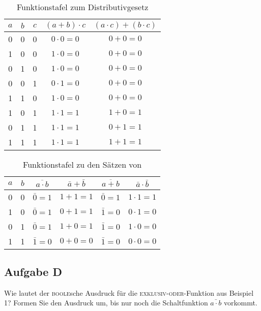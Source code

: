 \begin{table}
    \centering
    \begin{tabular}{ccc|c|c}
        $a$ & $b$ & $c$ & $(a + b) \cdot c$ & $(a \cdot c) + (b \cdot c)$
        \\
        \hline
        0 & 0 & 0 & $0 \cdot 0 = 0$ & $0 + 0 = 0$\\
        1 & 0 & 0 & $1 \cdot 0 = 0$ & $0 + 0 = 0$\\
        0 & 1 & 0 & $1 \cdot 0 = 0$ & $0 + 0 = 0$\\
        0 & 0 & 1 & $0 \cdot 1 = 0$ & $0 + 0 = 0$\\
        1 & 1 & 0 & $1 \cdot 0 = 0$ & $0 + 0 = 0$\\
        1 & 0 & 1 & $1 \cdot 1 = 1$ & $1 + 0 = 1$\\
        0 & 1 & 1 & $1 \cdot 1 = 1$ & $0 + 1 = 1$\\
        1 & 1 & 1 & $1 \cdot 1 = 1$ & $1 + 1 = 1$
    \end{tabular}
    \caption{%
        Funktionstafel zum Distributivgesetz
    }
    \label{tab:Aufgabe_C_dist}
\end{table}

\begin{table}
    \centering
    \begin{tabular}{cc|cc|cc}
        $a$ & $b$ & $\overline{a \cdot b}$ & $\bar a + \bar b$ & $\overline{a +
        b}$ & $\bar a \cdot \bar b$\\
        \hline
        0 & 0 & $\bar 0 = 1$ & $1 + 1 = 1$ & $\bar 0 = 1$ & $1 \cdot 1 = 1$\\
        1 & 0 & $\bar 0 = 1$ & $0 + 1 = 1$ & $\bar 1 = 0$ & $0 \cdot 1 = 0$\\
        0 & 1 & $\bar 0 = 1$ & $1 + 0 = 1$ & $\bar 1 = 0$ & $1 \cdot 0 = 0$\\
        1 & 1 & $\bar 1 = 0$ & $0 + 0 = 0$ & $\bar 1 = 0$ & $0 \cdot 0 = 0$
    \end{tabular}
    \caption{%
        Funktionstafel zu den Sätzen von 
    }
    \label{tab:Aufgabe_C_demo}
\end{table}

\FloatBarrier
\subsection{Aufgabe D} 

\begin{problem}
    Wie lautet der \textsc{boole}sche Ausdruck für die
    \textsc{exklusiv-oder}-Funktion aus Beispiel 1? Formen Sie den Ausdruck um,
    bis nur noch die Schaltfunktion $\bar{a \cdot b}$ vorkommt.
\end{problem}

